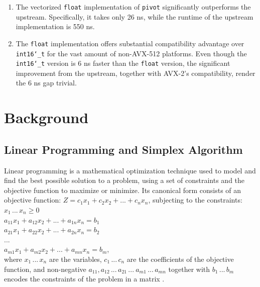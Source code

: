 \documentclass[logo,bsc,singlespacing,parskip]{infthesis}
\newcommand{\dtshort}{\texttt{int16\char`_t}}
\newcommand{\dtfloat}{\texttt{float}}
\newcommand{\pivot}{\texttt{pivot}}
\begin{document}
\begin{enumerate}
    \item The vectorized \dtfloat{} implementation of \pivot{} significantly outperforms the upstream. Specifically, it takes only 26 ns, while the
    runtime of the upstream implementation is 550 ns. 

    \item The \dtfloat{} implementation offers substantial compatibility advantage over \linebreak \dtshort{} for the vast amount of non-AVX-512 platforms. Even though the \dtshort{} version is 6 ns faster than the \dtfloat{} version, the significant improvement from the upstream, together with AVX-2's compatibility, render the 6 ns gap trivial. 
\end{enumerate}


\chapter{Background}
\section{Linear Programming and Simplex Algorithm}
\label{simplex}
Linear programming is a mathematical optimization technique used to model and find the best possible solution to a problem, using a set of constraints and the objective function to maximize or minimize. Its canonical form consists of an objective function:
\begin{math}
Z = c_1x_1 + c_2x_2 + ... + c_nx_n
\end{math}, subjecting to the constraints: \\
\begin{math}
x_1 \, ... \, x_n \ge 0
\end{math}\\
\begin{math}
a_{11}x_1 + a_{12}x_2 + ... + a_{1n}x_n = b_1 
\end{math}\\
\begin{math}
a_{21}x_1 + a_{22}x_2 + ... + a_{2n}x_n = b_2
\end{math}\\
\begin{math}
...
\end{math}\\
\begin{math}
a_{m1}x_1 + a_{m2}x_2 + ... + a_{mn}x_n = b_m
\end{math}, \\
where \begin{math}x_1 \,...\, x_n\end{math} are the variables, \begin{math}c_1 \,...\, c_n\end{math} are the coefficients of the objective function, and non-negative \begin{math}a_{11}, a_{12} \,...\, a_{21} \,...\ a_{m1} \,...\, a_{mn}\end{math} together with \begin{math}b_1 \,...\, b_m\end{math} encodes the constraints of the problem in a matrix \cite{FPL1}. 
\end{document}
